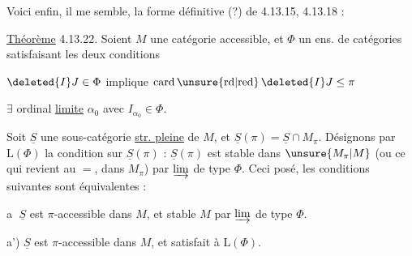 

Voici enfin, il me semble, la forme définitive (?) de 4.13.15, 4.13.18 :


\uline{Théorème} 4.13.22. Soient $M$ une catégorie accessible,  et $\Phi$ un ens. de catégories satisfaisant les deux conditions

 $\deleted{I}J\in\Phi$ implique $\mathrm{card}\,\unsure{\mathrm{rd}|\mathrm{red}}\,\deleted{I}J\leq\pi$

 $\exists$ ordinal \uline{limite} $\alpha_0$ avec $I_{\alpha_0}\in\Phi$.

 Soit $\underline S$ une sous-catégorie \uline{str. pleine} de $M$, et $\underline S(\pi)=\underline S\cap M_\pi$.  Désignons par $\mathrm L(\Phi)$ la condition sur $\underline S(\pi)$ : $\underline S(\pi)$ est stable dans $\unsure{M_\pi|M}$ (ou ce qui revient au $=$, dans $M_\pi$) par $\varinjlim$ de type $\Phi$. Ceci posé, les conditions suivantes  sont équivalentes :

\textcircled{a} $\underline S$ est $\pi$-accessible dans $M$, et stable  $M$ par $\varinjlim$ de type $\Phi$.

a') $\underline S$ est $\pi$-accessible dans $M$, et  satisfait à $\mathrm L(\Phi)$.


